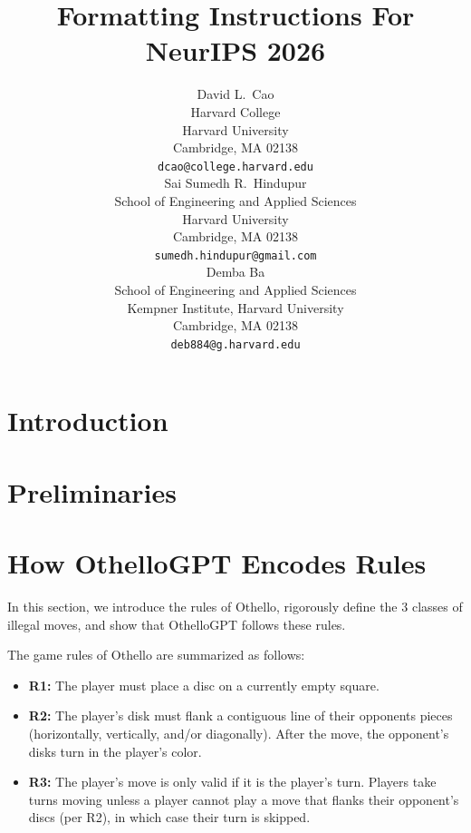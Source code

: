 \documentclass{article}
\title{Formatting Instructions For NeurIPS 2026}
\author{%
  David L.~Cao \\
  Harvard College\\
  Harvard University\\
  Cambridge, MA 02138 \\
  \texttt{dcao@college.harvard.edu} \\
  \And
  Sai Sumedh R.~Hindupur \\
  School of Engineering and Applied Sciences\\
  Harvard University\\
  Cambridge, MA 02138 \\
  \texttt{sumedh.hindupur@gmail.com} \\
  \And
  Demba Ba \\
  School of Engineering and Applied Sciences\\
  Kempner Institute, Harvard University\\
  Cambridge, MA 02138 \\
  \texttt{deb884@g.harvard.edu} \\
}
\begin{document}
\maketitle


\begin{abstract} 

\end{abstract}



\section{Introduction}

\section{Preliminaries}

\section{How OthelloGPT Encodes Rules}


In this section, we introduce the rules of Othello, rigorously define the $3$ classes of illegal moves, and show that OthelloGPT follows these rules.

The game rules of Othello are summarized as follows:
\begin{itemize}
    \item \textbf{R1:} The player must place a disc on a currently empty square. 
    \item \textbf{R2:} The player's disk must flank a contiguous line of their opponents pieces (horizontally, vertically, and/or diagonally). After the move, the opponent's disks turn in the player's color. 
    \item \textbf{R3:} The player's move is only valid if it is the player's turn. Players take turns moving unless a player cannot play a move that flanks their opponent's discs (per R2), in which case their turn is skipped.
\end{itemize}


\end{document}

